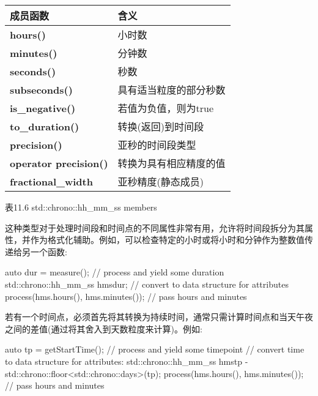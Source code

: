 \begin{longtable}[c]{|l|l|}
\hline
\textbf{成员函数}               & \textbf{含义}                                       \\ \hline
\endfirsthead
%
\endhead
%
\textbf{hours()}              & 小时数                                            \\ \hline
\textbf{minutes()}            & 分钟数                                          \\ \hline
\textbf{seconds()}            & 秒数                                          \\ \hline
\textbf{subseconds()}         & 具有适当粒度的部分秒数 \\ \hline
\textbf{is\_negative()}       & 若值为负值，则为true                          \\ \hline
\textbf{to\_duration()}       & 转换(返回)到时间段                         \\ \hline
\textbf{precision()}          & 亚秒的时间段类型                        \\ \hline
\textbf{operator precision()} & 转换为具有相应精度的值       \\ \hline
\textbf{fractional\_width}    & 亚秒精度(静态成员)            \\ \hline
\end{longtable}

\begin{center}
表11.6 std::chrono::hh\_mm\_ss members
\end{center}

这种类型对于处理时间段和时间点的不同属性非常有用，允许将时间段拆分为其属性，并作为格式化辅助。例如，可以检查特定的小时或将小时和分钟作为整数值传递给另一个函数:

\begin{cpp}
auto dur = measure(); // process and yield some duration
std::chrono::hh_mm_ss hms{dur}; // convert to data structure for attributes
process(hms.hours(), hms.minutes()); // pass hours and minutes
\end{cpp}

若有一个时间点，必须首先将其转换为持续时间，通常只需计算时间点和当天午夜之间的差值(通过将其舍入到天数粒度来计算)。例如:

\begin{cpp}
auto tp = getStartTime(); // process and yield some timepoint
// convert time to data structure for attributes:
std::chrono::hh_mm_ss hms{tp - std::chrono::floor<std::chrono::days>(tp)};
process(hms.hours(), hms.minutes()); // pass hours and minutes
\end{cpp}

